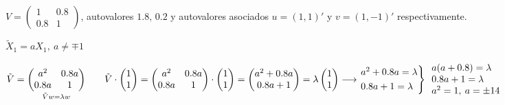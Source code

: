 \begin{enumerate}[label=\color{red}\textbf{\arabic*)}, leftmargin=*]
	$V=\begin{pmatrix}
	1 & 0.8\\
	0.8 & 1
	\end{pmatrix}$, autovalores $1.8,\,0.2$ y autovalores asociados $u=(1,1)'$ y $v=(1,-1)'$ respectivamente.
	
	$\tilde{X}_1=aX_1,\:a\neq\mp1$
	
	$\tilde{V}=\underset{\tilde{V}w=\lambda w}{\begin{pmatrix}
	a^2 & 0.8a\\
	0.8a & 1
	\end{pmatrix}}\qquad \tilde{V}\cdot\begin{pmatrix}
	1\\
	1
	\end{pmatrix}=\begin{pmatrix}
	a^2 & 0.8a\\
	0.8a & 1
	\end{pmatrix}\cdot\begin{pmatrix}
	1\\
	1
	\end{pmatrix}=\begin{pmatrix}
	a^2+0.8a\\
	0.8a+1
	\end{pmatrix}=\lambda\begin{pmatrix}
	1\\
	1
	\end{pmatrix}\longrightarrow\begin{rcases}
	a^2+0.8a=\lambda\\
	0.8a+1=\lambda
	\end{rcases}\begin{array}{l}
	a(a+0.8)=\lambda\\
	0.8a+1=\lambda\\
	a^2=1,\:a=\pm14
	\end{array}$
\end{enumerate}